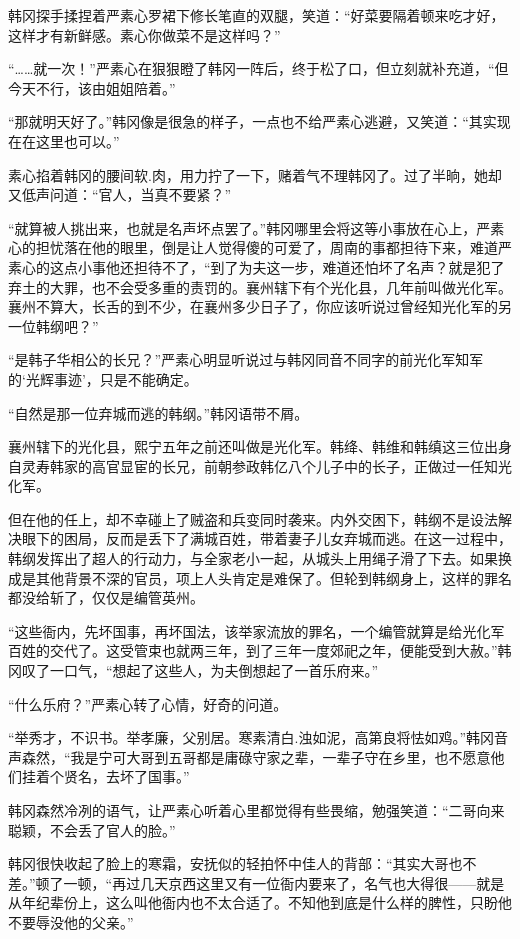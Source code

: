 韩冈探手揉捏着严素心罗裙下修长笔直的双腿，笑道：“好菜要隔着顿来吃才好，这样才有新鲜感。素心你做菜不是这样吗？”

“……就一次！”严素心在狠狠瞪了韩冈一阵后，终于松了口，但立刻就补充道，“但今天不行，该由姐姐陪着。”

“那就明天好了。”韩冈像是很急的样子，一点也不给严素心逃避，又笑道：“其实现在在这里也可以。”

素心掐着韩冈的腰间软.肉，用力拧了一下，赌着气不理韩冈了。过了半晌，她却又低声问道：“官人，当真不要紧？”

“就算被人挑出来，也就是名声坏点罢了。”韩冈哪里会将这等小事放在心上，严素心的担忧落在他的眼里，倒是让人觉得傻的可爱了，周南的事都担待下来，难道严素心的这点小事他还担待不了，“到了为夫这一步，难道还怕坏了名声？就是犯了弃土的大罪，也不会受多重的责罚的。襄州辖下有个光化县，几年前叫做光化军。襄州不算大，长舌的到不少，在襄州多少日子了，你应该听说过曾经知光化军的另一位韩纲吧？”

“是韩子华相公的长兄？”严素心明显听说过与韩冈同音不同字的前光化军知军的‘光辉事迹’，只是不能确定。

“自然是那一位弃城而逃的韩纲。”韩冈语带不屑。

襄州辖下的光化县，熙宁五年之前还叫做是光化军。韩绛、韩维和韩缜这三位出身自灵寿韩家的高官显宦的长兄，前朝参政韩亿八个儿子中的长子，正做过一任知光化军。

但在他的任上，却不幸碰上了贼盗和兵变同时袭来。内外交困下，韩纲不是设法解决眼下的困局，反而是丢下了满城百姓，带着妻子儿女弃城而逃。在这一过程中，韩纲发挥出了超人的行动力，与全家老小一起，从城头上用绳子滑了下去。如果换成是其他背景不深的官员，项上人头肯定是难保了。但轮到韩纲身上，这样的罪名都没给斩了，仅仅是编管英州。

“这些衙内，先坏国事，再坏国法，该举家流放的罪名，一个编管就算是给光化军百姓的交代了。这受管束也就两三年，到了三年一度郊祀之年，便能受到大赦。”韩冈叹了一口气，“想起了这些人，为夫倒想起了一首乐府来。”

“什么乐府？”严素心转了心情，好奇的问道。

“举秀才，不识书。举孝廉，父别居。寒素清白.浊如泥，高第良将怯如鸡。”韩冈音声森然，“我是宁可大哥到五哥都是庸碌守家之辈，一辈子守在乡里，也不愿意他们挂着个贤名，去坏了国事。”

韩冈森然冷冽的语气，让严素心听着心里都觉得有些畏缩，勉强笑道：“二哥向来聪颖，不会丢了官人的脸。”

韩冈很快收起了脸上的寒霜，安抚似的轻拍怀中佳人的背部：“其实大哥也不差。”顿了一顿，“再过几天京西这里又有一位衙内要来了，名气也大得很——就是从年纪辈份上，这么叫他衙内也不太合适了。不知他到底是什么样的脾性，只盼他不要辱没他的父亲。”

